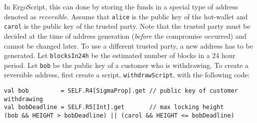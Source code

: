 \documentclass[runningheads]{llncs}
\newcommand{\langname}{ErgoScript\xspace}
\begin{document}
In \langname, this can done by storing the funds in a special type of address denoted as {\em reversible}. Assume that \texttt{alice} is the public key of the hot-wallet and \texttt{carol} is the public key of the trusted party. Note that the trusted party must be decided at the time of address generation ({\em before} the compromise occurred) and cannot be changed later. To use a different trusted party, a new address has to be generated. Let \texttt{blocksIn24h} be the estimated number of blocks in a 24 hour period. 
Let \texttt{bob} be the public key of a customer who is withdrawing. 
To create a reversible address, first create a script, \texttt{withdrawScript}, with the following code:
\small{
\begin{verbatim}
val bob         = SELF.R4[SigmaProp].get // public key of customer withdrawing
val bobDeadline = SELF.R5[Int].get       // max locking height
(bob && HEIGHT > bobDeadline) || (carol && HEIGHT <= bobDeadline)
\end{verbatim}
}
\end{document}

